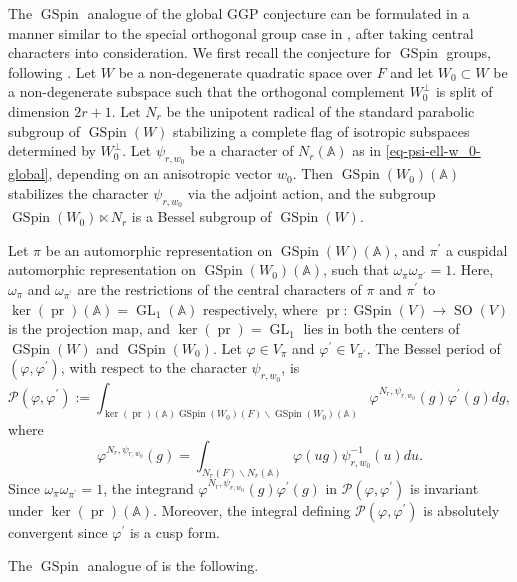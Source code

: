\documentclass[12pt]{amsart}
\newcommand{\A}{\mathbb{A}}
\theoremstyle{remark}
\newcommand{\pr}{\operatorname{pr}}
\DeclareMathOperator{\GL}{GL}
\DeclareMathOperator{\SO}{SO}
\DeclareMathOperator{\GSpin}{GSpin}
\begin{document}
 

The $\GSpin$ analogue of the global GGP conjecture can be formulated in a manner similar to  the special orthogonal group case in \cite{GanGrossPrasad2012}, after taking central characters into consideration.
We first recall the conjecture for $\GSpin$ groups, following \cite{GanGrossPrasad2012}. 
Let $W$ be a non-degenerate quadratic space over $F$ and let $W_0\subset W$ be a non-degenerate subspace such that the orthogonal complement $W_0^\perp$ is split of dimension  $2r+1$. Let $N_r$ be the unipotent radical of the standard parabolic subgroup of $\GSpin(W)$ stabilizing a complete flag of isotropic subspaces determined by $W_0^\perp$. Let $\psi_{r,w_0}$ be a character of $N_r(\A)$ as in \eqref{eq-psi-ell-w_0-global}, depending on an anisotropic vector $w_0$. Then $\GSpin(W_0)(\A)$ stabilizes the character $\psi_{r,w_0}$ via the adjoint action, and the subgroup $\GSpin(W_0) \ltimes N_r$ is a Bessel subgroup of $\GSpin(W)$. 


Let $\pi$ be an automorphic representation on $\GSpin(W)(\A)$, and $\pi^\prime$ a cuspidal automorphic representation on $\GSpin(W_0)(\A)$, such that $\omega_{\pi}\omega_{\pi^\prime}=1$. Here, $\omega_{\pi}$ and $\omega_{\pi^\prime}$ are the restrictions of the central characters of $\pi$ and $\pi^\prime$ to $\ker(\pr)(\A)=\GL_1(\A)$ respectively, where  $\pr: \GSpin(V)\to \SO(V)$ is the projection map, and $\ker(\pr)=\GL_1$ lies in both the centers of $\GSpin(W)$ and $\GSpin(W_0)$.
Let $\varphi\in V_{\pi}$ and $\varphi^\prime\in V_{\pi^\prime}$. 
 The Bessel period of $(\varphi,\varphi^\prime)$, with respect to the character $\psi_{r,w_0}$, is
\begin{equation*}
\mathcal{P}(\varphi, \varphi^\prime):=\int_{\ker(\pr)(\A) \GSpin(W_0)(F)\backslash \GSpin(W_0)(\A)} \varphi^{N_r, \psi_{r, w_0}}(g) \varphi^\prime(g) dg,	
\end{equation*}
where
\begin{equation*}
	\varphi^{N_r, \psi_{r, w_0}}(g)=\int_{N_r(F)\backslash N_r(\A)} \varphi(ug) \psi_{r,w_0}^{-1}(u)du.
\end{equation*}
Since $\omega_\pi \omega_{\pi^\prime}=1$, the integrand $\varphi^{N_r, \psi_{r, w_0}}(g) \varphi^\prime(g)$ in $\mathcal{P}(\varphi, \varphi^\prime)$ is invariant under $\ker(\pr)(\A)$. Moreover, the integral defining $\mathcal{P}(\varphi, \varphi^\prime)$ is absolutely  convergent since $\varphi^\prime$ is a cusp form. 

The $\GSpin$ analogue of \cite[Conjecture 24.1]{GanGrossPrasad2012} is the following.
 
\end{document}
